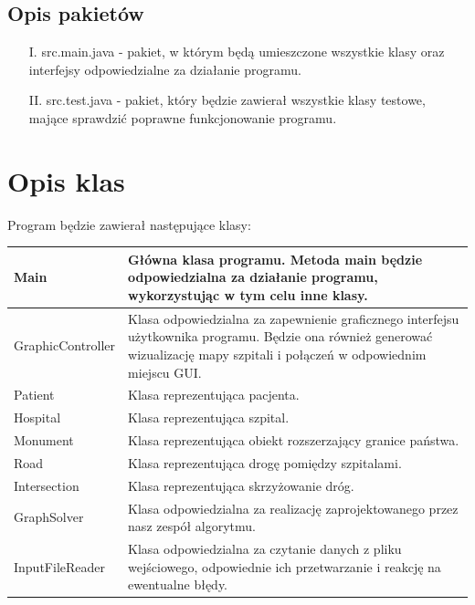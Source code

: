 \documentclass{article}
\begin{document}
    \subsection{Opis pakietów}
         \begin{itemize}
            \item[I.] src.main.java - pakiet, w którym będą umieszczone wszystkie klasy oraz interfejsy odpowiedzialne za działanie programu.
            \item[II.] src.test.java - pakiet, który będzie zawierał wszystkie klasy testowe, mające sprawdzić poprawne funkcjonowanie programu.
        \end{itemize}    
\section{Opis klas}

    Program będzie zawierał następujące klasy:

    \begin{center}
        \begin{tabular}{| >{\centering\arraybackslash}p{3 cm} | >{\centering\arraybackslash}p{8 cm} |}
            \hline
            Main & Główna klasa programu. Metoda main będzie odpowiedzialna za działanie programu, wykorzystując w tym celu inne klasy.\\ 
            \hline
            GraphicController & Klasa odpowiedzialna za zapewnienie graficznego interfejsu użytkownika programu. Będzie ona również generować wizualizację mapy szpitali i połączeń w odpowiednim miejscu GUI.\\ 
            \hline
            Patient & Klasa reprezentująca pacjenta.\\
            \hline
            Hospital & Klasa reprezentująca szpital.\\
            \hline
            Monument & Klasa reprezentująca obiekt rozszerzający granice państwa.\\
            \hline
            Road & Klasa reprezentująca drogę pomiędzy szpitalami.\\
            \hline
            Intersection & Klasa reprezentująca skrzyżowanie dróg.\\
            \hline
            GraphSolver & Klasa odpowiedzialna za realizację zaprojektowanego przez nasz zespół algorytmu.\\
            \hline
            InputFileReader & Klasa odpowiedzialna za czytanie danych z pliku wejściowego, odpowiednie ich przetwarzanie i reakcję na ewentualne błędy.\\
            \hline
        \end{tabular}
    \end{center}
\end{document}
